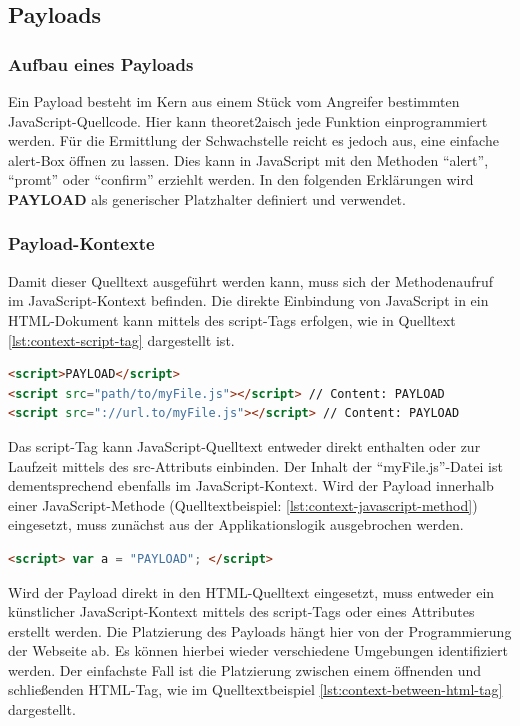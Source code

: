 \subsection{Payloads}

\subsubsection{Aufbau eines Payloads}
		Ein Payload besteht im Kern aus einem Stück vom Angreifer bestimmten JavaScript-Quellcode. Hier kann theoret2aisch jede Funktion einprogrammiert werden. Für die Ermittlung der Schwachstelle reicht es jedoch aus, eine einfache alert-Box öffnen zu lassen. Dies kann in JavaScript mit den Methoden ``alert'', ``promt'' oder ``confirm'' erziehlt werden. In den folgenden Erklärungen wird \textbf{PAYLOAD} als generischer Platzhalter definiert und verwendet.

\subsubsection{Payload-Kontexte}
		
		Damit dieser Quelltext ausgeführt werden kann, muss sich der Methodenaufruf im JavaScript-Kontext befinden. Die direkte Einbindung von JavaScript in ein HTML-Dokument kann mittels des script-Tags erfolgen, wie in Quelltext \ref{lst:context-script-tag} dargestellt ist.
		
\begin{lstlisting}[language=HTML,caption={Kontexte: Payload in script-Tags},label=lst:context-script-tag]
<script>PAYLOAD</script>
<script src="path/to/myFile.js"></script> // Content: PAYLOAD
<script src="://url.to/myFile.js"></script> // Content: PAYLOAD
\end{lstlisting}
		
		Das script-Tag kann JavaScript-Quelltext entweder direkt enthalten oder zur Laufzeit mittels des src-Attributs einbinden. Der Inhalt der ``myFile.js''-Datei ist dementsprechend ebenfalls im JavaScript-Kontext. Wird der Payload innerhalb einer JavaScript-Methode (Quelltextbeispiel: \ref{lst:context-javascript-method}) eingesetzt, muss zunächst aus der Applikationslogik ausgebrochen werden.
		
\begin{lstlisting}[language=HTML,caption={Kontexte: Payload in Zuweisungswerten},label=lst:context-javascript-method]
<script> var a = "PAYLOAD"; </script>
\end{lstlisting}
		
		Wird der Payload direkt in den HTML-Quelltext eingesetzt, muss entweder ein künstlicher JavaScript-Kontext mittels des script-Tags oder eines Attributes erstellt werden. Die Platzierung des Payloads hängt hier von der Programmierung der Webseite ab. Es können hierbei wieder verschiedene Umgebungen identifiziert werden. Der einfachste Fall ist die Platzierung zwischen einem öffnenden und schließenden HTML-Tag, wie im Quelltextbeispiel \ref{lst:context-between-html-tag} dargestellt.
		

